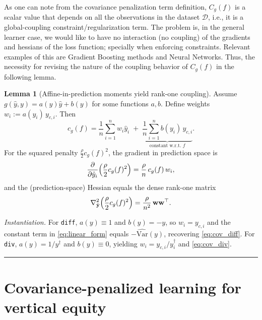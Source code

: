 \documentclass[11pt]{article}
\theoremstyle{plain}
\theoremstyle{definition}
\newcommand{\1}{\mathbf{1}}
\newcommand{\D}{\mathcal{D}}
\begin{document}
As one can note from the covariance penalization term definition, $C_g(f)$ is a scalar value that depends on all the observations in the dataset $\D$, i.e., it is a global-coupling constraint/regularization term. The problem is, { in the general learner case, we would like to have no interaction (no coupling) of the gradients and hessians of the loss function; specially when enforcing constraints}. Relevant examples of this are Gradient Boosting methods and Neural Networks. Thus, the necessity for revising the nature of the coupling behavior of $C_g(f)$ in the following lemma. 

\newtheorem{lemma}{Lemma} 
\begin{lemma}[Affine-in-prediction moments yield rank-one coupling]
\label{lem:rank_one}
Assume $g(\hat y,y)=a(y)\hat y+b(y)$ for some functions $a,b$. Define weights
$w_i:=a(y_i)\,y_{c,i}$. Then
\begin{equation}
\label{eq:linear_form}
c_g(f)=\frac{1}{n}\sum_{i=1}^n w_i \hat y_i \;+\; \underbrace{\frac{1}{n}\sum_{i=1}^n b(y_i)\,y_{c,i}}_{\text{constant w.r.t. }f}.
\end{equation}
For the squared penalty $\frac{\rho}{2}c_g(f)^2$, the gradient in prediction space is
\begin{equation}
\label{eq:grad_general}
\frac{\partial}{\partial \hat y_i}\Bigl(\frac{\rho}{2}c_g(f)^2\Bigr)
=\frac{\rho}{n}\,c_g(f)\,w_i,
\end{equation}
and the (prediction-space) Hessian equals the dense rank-one matrix
\begin{equation}
\label{eq:hess_general}
\nabla^2_{\hat{\mathbf y}}\Bigl(\frac{\rho}{2}c_g(f)^2\Bigr)=\frac{\rho}{n^2}\,\mathbf w\mathbf w^\top.
\end{equation}
\end{lemma}

\noindent
\emph{Instantiation.}
For \texttt{diff}, $a(y)\equiv 1$ and $b(y)=-y$, so $w_i=y_{c,i}$ and the constant term in
\eqref{eq:linear_form} equals $-\widehat{\mathrm{Var}}(y)$, recovering \eqref{eq:cov_diff}.
For \texttt{div}, $a(y)=1/y^\dagger$ and $b(y)\equiv 0$, yielding $w_i=y_{c,i}/y_i^\dagger$ and
\eqref{eq:cov_div}.

\hrule



\section{Covariance-penalized learning for vertical equity}
\label{sec:cov_penalty_general}
\end{document}
